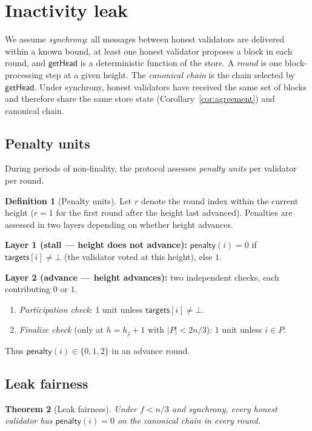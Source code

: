 \documentclass{article}
\newcommand{\targets}{\mathsf{targets}}
\newcommand{\pnlty}{\mathsf{penalty}}
\theoremstyle{plain}
\newtheorem{theorem}{Theorem}
\theoremstyle{definition}
\newtheorem{definition}[theorem]{Definition}
\theoremstyle{remark}
\begin{document}
\section{Inactivity leak}

We assume \emph{synchrony}: all messages between honest validators are delivered within a known bound, at least one honest validator proposes a block in each round, and $\textsf{getHead}$ is a deterministic function of the store.
A \emph{round} is one block-processing step at a given height.
The \emph{canonical chain} is the chain selected by $\textsf{getHead}$.
Under synchrony, honest validators have received the same set of blocks and therefore share the same store state (Corollary~\ref{cor:agreement}) and canonical chain.

\subsection{Penalty units}

During periods of non-finality, the protocol assesses \emph{penalty units} per validator per round.

\begin{definition}[Penalty units]\label{def:penalty}
Let $r$ denote the round index within the current height ($r = 1$ for the first round after the height last advanced).
Penalties are assessed in two layers depending on whether height advances.

\medskip\noindent\textbf{Layer 1 (stall --- height does not advance):}
$\pnlty(i) = 0$ if $\targets[i] \neq \bot$ (the validator voted at this height), else $1$.

\medskip\noindent\textbf{Layer 2 (advance --- height advances):}
two independent checks, each contributing $0$ or $1$.
\begin{enumerate}
  \item \emph{Participation check}: $1$ unit unless $\targets[i] \neq \bot$.
  \item \emph{Finalize check} (only at $h = h_j + 1$ with $|P| < 2n/3$): $1$ unit unless $i \in P$.
\end{enumerate}
Thus $\pnlty(i) \in \{0, 1, 2\}$ in an advance round.
\end{definition}

\subsection{Leak fairness}

\begin{theorem}[Leak fairness]\label{thm:fairness}
Under $f < n/3$ and synchrony, every honest validator has $\pnlty(i) = 0$ on the canonical chain in every round.
\end{theorem}
\end{document}
